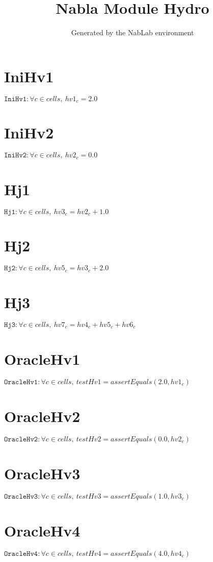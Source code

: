 \documentclass[11pt]{article}
\title{Nabla Module Hydro}
\author{Generated by the NabLab environment}
\begin{document}
\maketitle


\section{IniHv1}
$\texttt{IniHv1} : \forall{c\in cells}, \ hv1_{c} = 2.0$


\section{IniHv2}
$\texttt{IniHv2} : \forall{c\in cells}, \ hv2_{c} = 0.0$


\section{Hj1}
$\texttt{Hj1} : \forall{c\in cells}, \ hv3_{c} = hv2_{c} + 1.0$


\section{Hj2}
$\texttt{Hj2} : \forall{c\in cells}, \ hv5_{c} = hv3_{c} + 2.0$


\section{Hj3}
$\texttt{Hj3} : \forall{c\in cells}, \ hv7_{c} = hv4_{c} + hv5_{c} + hv6_{c}$


\section{OracleHv1}
$\texttt{OracleHv1} : \forall{c\in cells}, \ testHv1=assertEquals\left(2.0,hv1_{c}\right)$


\section{OracleHv2}
$\texttt{OracleHv2} : \forall{c\in cells}, \ testHv2=assertEquals\left(0.0,hv2_{c}\right)$


\section{OracleHv3}
$\texttt{OracleHv3} : \forall{c\in cells}, \ testHv3=assertEquals\left(1.0,hv3_{c}\right)$


\section{OracleHv4}
$\texttt{OracleHv4} : \forall{c\in cells}, \ testHv4=assertEquals\left(4.0,hv4_{c}\right)$
\end{document}
